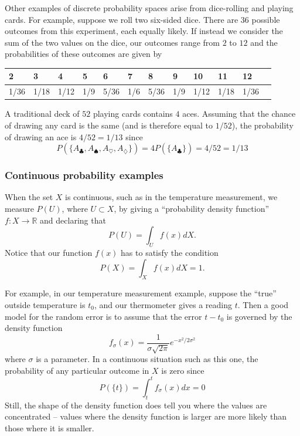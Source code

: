 \documentclass[
]{article}
\makeatletter
\newcounter{tableno}
\newenvironment{tablenos:no-prefix-table-caption}{
  \caption@ifcompatibility{}{
    \let\oldthetable\thetable
    \let\oldtheHtable\theHtable
    \renewcommand{\thetable}{tableno:\thetableno}
    \renewcommand{\theHtable}{tableno:\thetableno}
    \stepcounter{tableno}
    \captionsetup{labelformat=empty}
  }
}{
  \caption@ifcompatibility{}{
    \captionsetup{labelformat=default}
    \let\thetable\oldthetable
    \let\theHtable\oldtheHtable
    \addtocounter{table}{-1}
  }
}
\makeatother
\begin{document}
Other examples of discrete probability spaces arise from dice-rolling
and playing cards. For example, suppose we roll two six-sided dice.
There are \(36\) possible outcomes from this experiment, each equally
likely. If instead we consider the sum of the two values on the dice,
our outcomes range from \(2\) to \(12\) and the probabilities of these
outcomes are given by

\begin{tablenos:no-prefix-table-caption}

\begin{longtable}[]{@{}llllllllllll@{}}
\toprule
2 & 3 & 4 & 5 & 6 & 7 & 8 & 9 & 10 & 11 & 12 &\tabularnewline
\midrule
\endhead
1/36 & 1/18 & 1/12 & 1/9 & 5/36 & 1/6 & 5/36 & 1/9 & 1/12 & 1/18 & 1/36
&\tabularnewline
\bottomrule
\end{longtable}

\end{tablenos:no-prefix-table-caption}

A traditional deck of \(52\) playing cards contains \(4\) aces. Assuming
that the chance of drawing any card is the same (and is therefore equal
to \(1/52\)), the probability of drawing an ace is \(4/52=1/13\) since
\[
P(\{A_{\clubsuit},A_{\spadesuit},A_{\heartsuit},A_{\diamondsuit}\}) = 4P(\{A_{\clubsuit}\})=4/52=1/13
\]

\hypertarget{continuous-probability-examples}{%
\subsubsection{Continuous probability
examples}\label{continuous-probability-examples}}

When the set \(X\) is continuous, such as in the temperature
measurement, we measure \(P(U)\), where \(U\subset X\), by giving a
``probability density function'' \(f:X\to \mathbb{R}\) and declaring
that \[
P(U) = \int_{U}f(x) dX.
\] Notice that our function \(f(x)\) has to satisfy the condition \[
P(X)=\int_{X} f(x)dX = 1.
\]

For example, in our temperature measurement example, suppose the
``true'' outside temperature is \(t_0\), and our thermometer gives a
reading \(t\). Then a good model for the random error is to assume that
the error \(t-t_0\) is governed by the density function \[
f_\sigma(x) = \frac{1}{\sigma\sqrt{2\pi}}e^{-x^2/2\sigma^2}
\] where \(\sigma\) is a parameter. In a continuous situation such as
this one, the probability of any particular outcome in \(X\) is zero
since \[
P(\{t\})=\int_{t}^{t}f_{\sigma}(x)dx = 0
\] Still, the shape of the density function does tell you where the
values are concentrated -- values where the density function is larger
are more likely than those where it is smaller.
\end{document}
